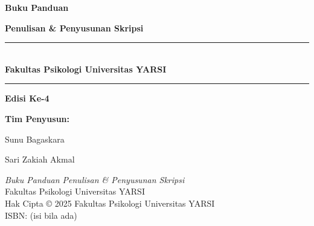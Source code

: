 

\cleardoublepage

\begin{titlepage}
\thispagestyle{empty}
\centering
\vspace*{2.5cm}
{\fontsize{22pt}{26pt}\selectfont\bfseries Buku Panduan\\[2mm]}
{\fontsize{22pt}{26pt}\selectfont\bfseries Penulisan \& Penyusunan Skripsi\par}

\vspace{1.2cm}
\rule{\linewidth}{0.5pt}\\[-6pt]
{\large \textbf{Fakultas Psikologi Universitas YARSI}}\par
\rule{\linewidth}{0.5pt}

\vspace{1.4cm}
{\large \textbf{Edisi Ke-4}\par}

\vfill
{\large \textbf{Tim Penyusun:}}\par
{\large Sunu Bagaskara\par}
{\large Sari Zakiah Akmal\par}
\vspace*{1.2cm}
\end{titlepage}
\cleardoublepage

\clearpage
{}\par
\vspace{0.8\baselineskip}
\textit{Buku Panduan Penulisan \& Penyusunan Skripsi}\\
Fakultas Psikologi Universitas YARSI\\[6pt]
Hak Cipta © 2025 Fakultas Psikologi Universitas YARSI\\
ISBN: (isi bila ada)
\cleardoublepage
